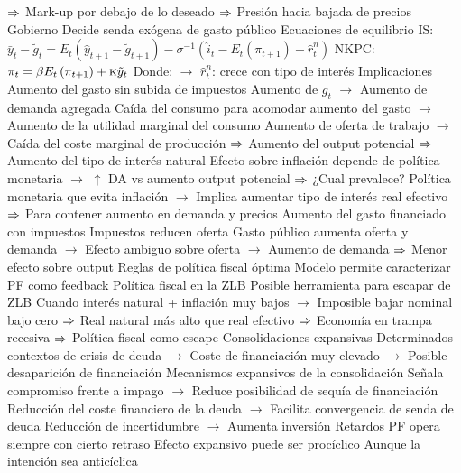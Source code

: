 \documentclass{nuevotema}
\begin{document}
\begin{esquemal}
				\4[] $\Rightarrow$ Mark-up por debajo de lo deseado
				\4[] $\Rightarrow$ Presión hacia bajada de precios
				\4 Gobierno
				\4[] Decide senda exógena de gasto público
				\4 Ecuaciones de equilibrio
				\4[] IS: $\bar{y}_t - \tilde{g}_t = E_t \left( \hat{y}_{t+1} -\tilde{g}_{t+1} \right) - \sigma^{-1} \left( \hat{i}_t - E_t \left(    \pi_{t+1}\right) - \hat{r}_t^n  \right)$
				\4[] NKPC: $\pi_t = \beta E_t \left( \pi_{t+1} \right) + \textsc{k} \tilde{y}_t$
				\4[] Donde:
				\4[] $\to$ $\hat{r}_t^n$: crece con tipo de interés
			\3 Implicaciones
				\4 Aumento del gasto sin subida de impuestos
				\4[] Aumento de $g_t$
				\4[] $\to$ Aumento de demanda agregada
				\4[] Caída del consumo para acomodar aumento del gasto
				\4[] $\to$ Aumento de la utilidad marginal del consumo
				\4[] Aumento de oferta de trabajo
				\4[] $\to$ Caída del coste marginal de producción
				\4[] $\Rightarrow$ Aumento del output potencial
				\4[] $\Rightarrow$ Aumento del tipo de interés natural
				\4[] Efecto sobre inflación depende de política monetaria
				\4[] $\to$ $\uparrow$ DA vs aumento output potencial
				\4[] $\Rightarrow$ ¿Cual prevalece?
				\4[] Política monetaria que evita inflación
				\4[] $\to$ Implica aumentar tipo de interés real efectivo
				\4[] $\Rightarrow$ Para contener aumento en demanda y precios
				\4 Aumento del gasto financiado con impuestos
				\4[] Impuestos reducen oferta
				\4[] Gasto público aumenta oferta y demanda
				\4[] $\to$ Efecto ambiguo sobre oferta
				\4[] $\to$ Aumento de demanda
				\4[] $\Rightarrow$ Menor efecto sobre output
				\4 Reglas de política fiscal óptima
				\4[] Modelo permite caracterizar PF como feedback
				\4 Política fiscal en la ZLB
				\4[] Posible herramienta para escapar de ZLB
				\4[] Cuando interés natural + inflación muy bajos
				\4[] $\to$ Imposible bajar nominal bajo cero
				\4[] $\Rightarrow$ Real natural más alto que real efectivo
				\4[] $\Rightarrow$ Economía en trampa recesiva
				\4[] $\Rightarrow$ Política fiscal como escape
				\4 Consolidaciones expansivas
				\4[] Determinados contextos de crisis de deuda
				\4[] $\to$ Coste de financiación muy elevado
				\4[] $\to$ Posible desaparición de financiación
				\4 Mecanismos expansivos de la consolidación
				\4[] Señala compromiso frente a impago
				\4[] $\to$ Reduce posibilidad de sequía de financiación
				\4[] Reducción del coste financiero de la deuda
				\4[] $\to$ Facilita convergencia de senda de deuda
				\4[] Reducción de incertidumbre
				\4[] $\to$ Aumenta inversión
			\3 Retardos
				\4 PF opera siempre con cierto retraso
				\4 Efecto expansivo puede ser procíclico
				\4[] Aunque la intención sea anticíclica

\end{esquemal}
\end{document}
